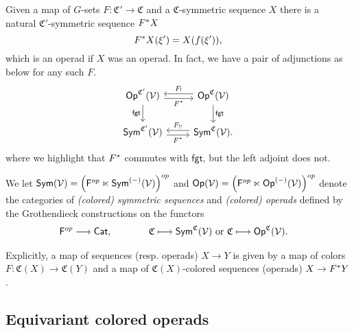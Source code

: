 \documentclass[a4paper,10pt
,draft
]{article}%
\renewcommand{\1}{\eta}%
\begin{document}
\begin{definition}
      \label{OP_MAP_DEFN}
      Given a map of $G$-sets $F: \mathfrak C' \to \mathfrak C$ and a $\mathfrak C$-symmetric sequence $X$
      there is a natural $\mathfrak C'$-symmetric sequence $F^{\**}X$
      \begin{equation}
            F^{\**}X(\xi') = X(f(\xi')),
      \end{equation}
      which is an operad if $X$ was an operad.
      In fact, we have a pair of adjunctions as below for any such $F$.
      \begin{equation}
            \label{C_CHANGE_EQ}
            \begin{tikzcd}
                  \Op^{\mathfrak C'}(\V) \arrow[r, shift right, "F^{\**}"'] \arrow[d, "\mathsf{fgt}"']
                  &
                  \Op^{\mathfrak C}(\V) \arrow[l, shift right, "F_!"'] \arrow[d, "\mathsf{fgt}"]
                  \\
                  \Sym^{\mathfrak C'}(\V) \arrow[r, shift right, "F^{\**}"']
                  &
                  \Sym^{\mathfrak C}(\V) \arrow[l, shift right, "F_{!!}"'].
            \end{tikzcd}
      \end{equation}
      where we highlight that $F^{\**}$ commutes with $\mathsf{fgt}$, but the left adjoint does not.

      We let $\mathsf{Sym}(\mathcal V) = \left(\mathsf F^{op} \ltimes \mathsf{Sym}^{(-)}(\mathcal V)\right)^{op}$ and $\mathsf{Op}(\mathcal V) = \left(\mathsf F^{op} \ltimes \mathsf{Op}^{(-)}(\mathcal V)\right)^{op}$
      denote the categories of
      \textit{(colored) symmetric sequences} and \textit{(colored) operads}
      defined by the Grothendieck constructions on the functors
      \begin{align*}
        \mathsf F^{op} \longrightarrow \mathsf{Cat},
        \qquad \qquad
        &
          \mathfrak C \longmapsto \mathsf{Sym}^{\mathfrak C}(\mathcal V)
          \mbox{ or }
          \mathfrak C \longmapsto \mathsf{Op}^{\mathfrak C}(\mathcal V).
      \end{align*}
      
      Explicitly, a map of sequences (resp. operads) $X \to Y$ is given by a map of colors
      $F: \mathfrak C(X) \to \mathfrak C(Y)$
      and a map of $\mathfrak C(X)$-colored sequences (operads)
      $X \to F^{\**} Y$.
\end{definition}


\subsection{Equivariant colored operads}
\end{document}
